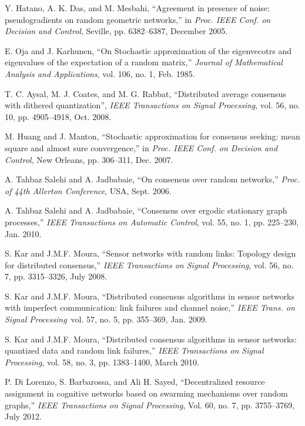 \documentclass[10pt,twocolumn]{IEEEtran}
\begin{document}
\begin{thebibliography}{1}
Y. Hatano, A. K. Das, and M. Mesbahi, ``Agreement in presence of noise: pseudogradients on random geometric networks,'' in {\it Proc. IEEE Conf. on Decision and Control}, Seville, pp. 6382--6387, December 2005.

E. Oja and J. Karhunen, ``On Stochastic approximation of the eigenvecotrs and eigenvalues of the expectation of a random matrix,'' {\it Journal of Mathematical Analysis and Applications}, vol. 106, no. 1, Feb. 1985.

T. C. Aysal, M. J. Coates, and M. G. Rabbat, ``Distributed average consensus with dithered quantization'', {\it IEEE Transactions on Signal Processing}, vol. 56, no. 10, pp. 4905--4918, Oct. 2008.

M. Huang and J. Manton, ``Stochastic approximation for consensus seeking: mean square and almost sure convergence,'' in {\it Proc. IEEE Conf. on Decision and Control}, New Orleans, pp. 306--311, Dec. 2007.

A. Tahbaz Salehi and A. Jadbabaie, ``On consensus over random networks,'' {\it Proc. of 44th Allerton Conference}, USA, Sept. 2006.

A. Tahbaz Salehi and A. Jadbabaie, ``Consensus over ergodic stationary graph processes,'' {\it IEEE Transactions on Automatic Control}, vol. 55, no. 1, pp. 225--230, Jan. 2010.

S. Kar and J.M.F. Moura, ``Sensor networks with random links: Topology design for distributed consensus,'' {\it IEEE Transactions on Signal Processing}, vol. 56, no. 7, pp. 3315--3326, July 2008.

S. Kar and J.M.F. Moura, ``Distributed consensus algorithms in sensor networks with imperfect communication: link failures and channel noise,''  {\it IEEE Trans. on Signal Processing}\, vol. 57, no. 5, pp. 355--369, Jan. 2009.

S. Kar and J.M.F. Moura, ``Distributed consensus algorithms in sensor networks: quantized data and random link failures,'' {\it IEEE Transactions on Signal Processing}, vol. 58, no. 3, pp. 1383--1400, March 2010.

P. Di Lorenzo, S. Barbarossa, and Ali H. Sayed, ``Decentralized resource assignment in cognitive networks based on swarming mechanisms over random graphs,'' {\it IEEE Transactions on Signal Processing}, Vol. 60, no. 7, pp. 3755--3769, July 2012.




\end{thebibliography}
\end{document}
